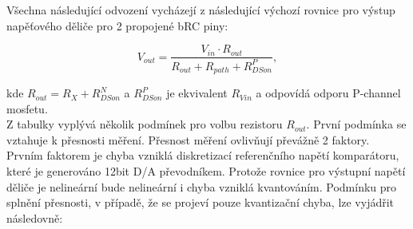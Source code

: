 \begin{table}[ht!]
    \caption{Požadované měřící charakteristiky}
    \label{tab:Požadované měřící charakteristiky}
\end{table}

Všechna následující odvození vycházejí z následující výchozí rovnice pro výstup napěťového děliče pro 2 propojené bRC piny:

\begin{equation}
V_{out} = \frac{ V_{in}\cdot R_{out} }  {R_{out} + R_{path} + R^P_{DSon}},
\end{equation}

kde ${R_{out}} = R_X + R^N_{DSon}$ a $R^P_{DSon}$ je ekvivalent $R_{Vin}$ a odpovídá odporu P-channel mosfetu. \\

Z tabulky vyplývá několik podmínek pro volbu rezistoru ${R_{out}}$. První podmínka se vztahuje k přesnosti měření. Přesnost měření ovlivňují převážně 2 faktory.
Prvním faktorem je chyba vzniklá diskretizací referenčního napětí komparátoru,
které je generováno 12bit D/A převodníkem. Protože rovnice pro výstupní napětí děliče je nelineární
bude nelineární i chyba vzniklá kvantováním. Podmínku pro splnění přesnosti, v případě, že se projeví pouze kvantizační chyba, lze vyjádřit následovně:

